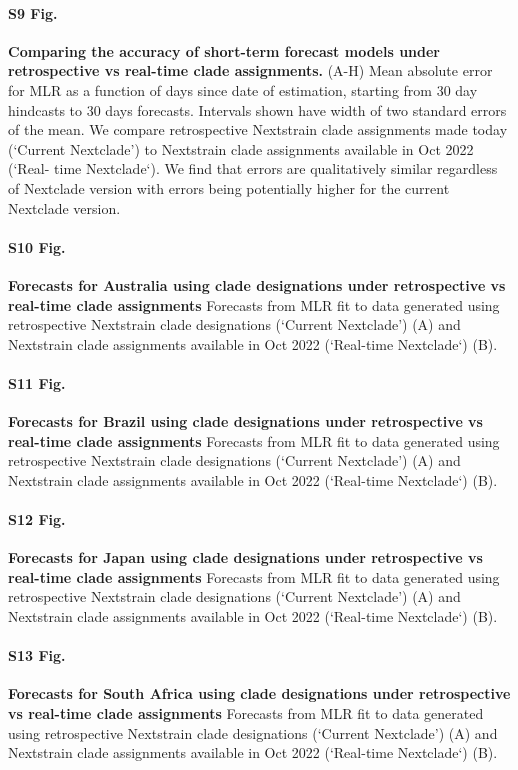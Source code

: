 \documentclass[10pt,letterpaper]{article}
\begin{document}
\paragraph*{S9 Fig.}
\label{fig:S9}
{\bf Comparing the accuracy of short-term forecast models under retrospective vs real-time clade assignments.}
(A-H) Mean absolute error for MLR as a function of days
since date of estimation, starting from 30 day hindcasts to 30 days forecasts. Intervals shown have
width of two standard errors of the mean. We compare retrospective Nextstrain clade assignments
made today (‘Current Nextclade’) to Nextstrain clade assignments available in Oct 2022 (‘Real-
time Nextclade‘). We find that errors are qualitatively similar regardless of Nextclade version with
errors being potentially higher for the current Nextclade version.

\paragraph*{S10 Fig.}
\label{fig:S10}
{\bf Forecasts for Australia using clade designations under retrospective vs real-time clade assignments}
Forecasts from MLR fit to data generated using retrospective Nextstrain clade designations (‘Current Nextclade’) (A) and Nextstrain clade assignments available
in Oct 2022 (‘Real-time Nextclade‘) (B).

\paragraph*{S11 Fig.}
\label{fig:S11}
{\bf Forecasts for Brazil using clade designations under retrospective vs real-time clade assignments}
Forecasts from MLR fit to data generated using retrospective Nextstrain
clade designations (‘Current Nextclade’) (A) and Nextstrain clade assignments available in Oct
2022 (‘Real-time Nextclade‘) (B).

\paragraph*{S12 Fig.}
\label{fig:S12}
{\bf Forecasts for Japan using clade designations under retrospective vs real-time clade assignments}
Forecasts from MLR fit to data generated using retrospective Nextstrain
clade designations (‘Current Nextclade’) (A) and Nextstrain clade assignments available in Oct
2022 (‘Real-time Nextclade‘) (B).

\paragraph*{S13 Fig.}
\label{fig:S13}
{\bf Forecasts for South Africa using clade designations under retrospective vs real-time clade assignments }
Forecasts from MLR fit to data generated using retrospective Nextstrain clade designations (‘Current Nextclade’) (A) and Nextstrain clade assignments available
in Oct 2022 (‘Real-time Nextclade‘) (B).
\end{document}
